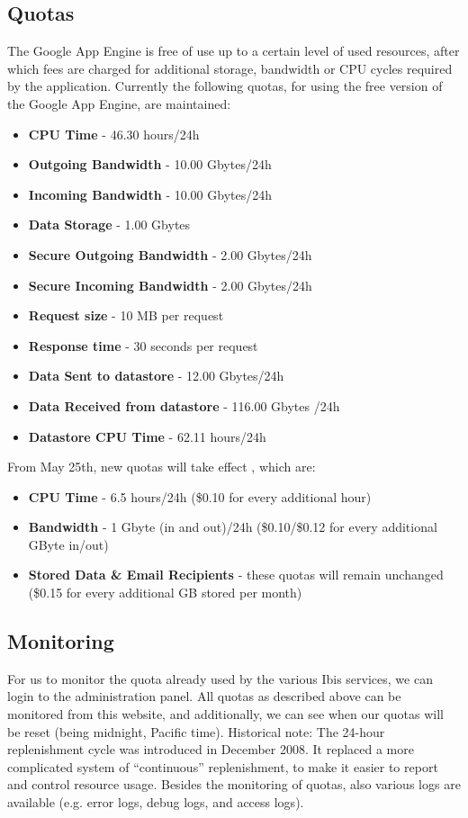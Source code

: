 \subsection{Quotas}
\label{appengine-quotas}
The Google App Engine is free of use up to a certain level of used resources,
after which fees are charged for additional storage, bandwidth or CPU cycles
required by the application. Currently the following quotas, for using the free
version of the Google App Engine, are maintained:

\begin{itemize}
\item \textbf{CPU Time} - 46.30 hours/24h
\item \textbf{Outgoing Bandwidth} - 10.00 Gbytes/24h
\item \textbf{Incoming Bandwidth} - 10.00 Gbytes/24h
\item \textbf{Data Storage} - 1.00 Gbytes
\item \textbf{Secure Outgoing Bandwidth} - 2.00 Gbytes/24h
\item \textbf{Secure Incoming Bandwidth} - 2.00 Gbytes/24h
\item \textbf{Request size} - 10 MB per request
\item \textbf{Response time} - 30 seconds per request
\item \textbf{Data Sent to datastore} - 12.00 Gbytes/24h
\item \textbf{Data Received from datastore} - 116.00 Gbytes /24h
\item \textbf{Datastore CPU Time} - 62.11 hours/24h
\end{itemize}
From May 25th, new quotas will take effect \cite{app-engine-quotas}, which are:
\begin{itemize} 
\item \textbf{CPU Time} - 6.5 hours/24h (\$0.10 for every additional hour)
\item \textbf{Bandwidth} - 1 Gbyte (in and out)/24h (\$0.10/\$0.12 for every additional
GByte in/out)
\item \textbf{Stored Data \& Email Recipients} - these quotas will remain
unchanged (\$0.15 for every additional GB stored per month)
\end{itemize}

\subsection{Monitoring}
For us to monitor the quota already used by the various Ibis services, we can
login to the administration panel. All quotas as described above can be
monitored from this website, and additionally, we can see when our quotas will be
reset (being midnight, Pacific time). Historical note: The 24-hour replenishment
cycle was introduced in December 2008. It replaced a more complicated system of
``continuous'' replenishment, to make it easier to report and control resource
usage. Besides the monitoring of quotas, also various logs are available (e.g.
error logs, debug logs, and access logs).
